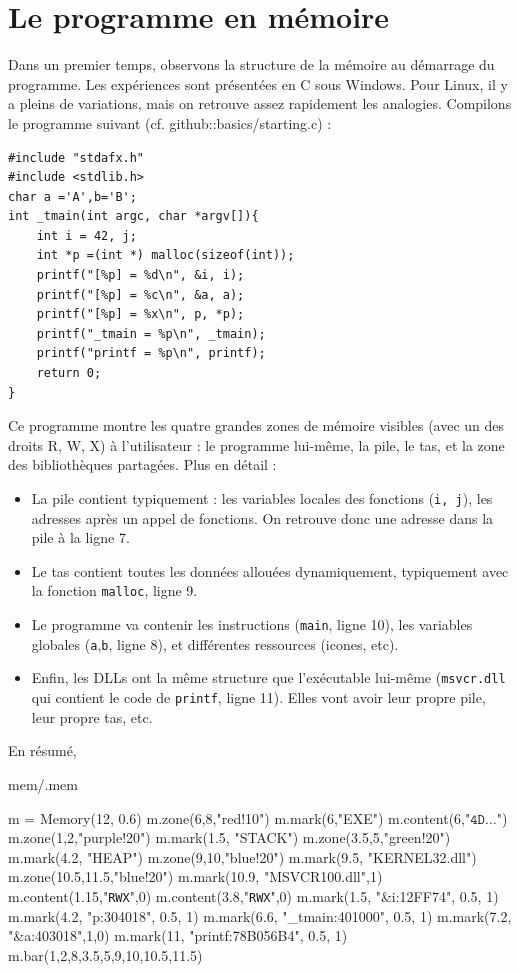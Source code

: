 \documentclass{book}
\newcounter{Qcours}
\newenvironment{memory}{%
	\noindent
	\VerbatimEnvironment\stepcounter{Qcours}%
	\begin{VerbatimOut}{mem/\theQcours.mem}%
	}{\end{VerbatimOut}%
}
\newcommand{\C}{\textsc{C}\xspace}
\newcommand{\code}[1]{\texttt{#1}}
\begin{document}
\section{Le programme en mémoire}

Dans un premier temps, observons la structure de la mémoire au démarrage du programme. Les expériences sont présentées en \C sous Windows. Pour Linux, il y a pleins de variations, mais on retrouve assez rapidement les analogies. Compilons le programme suivant (cf. github::basics/starting.c) : 

\begin{verbatim}
#include "stdafx.h"
#include <stdlib.h>
char a ='A',b='B';
int _tmain(int argc, char *argv[]){
	int i = 42, j;
	int *p =(int *) malloc(sizeof(int));
	printf("[%p] = %d\n", &i, i);
	printf("[%p] = %c\n", &a, a);
	printf("[%p] = %x\n", p, *p);
	printf("_tmain = %p\n", _tmain);
	printf("printf = %p\n", printf);
	return 0;
}
\end{verbatim}

Ce programme montre les quatre grandes zones de mémoire visibles (avec un des droits R, W, X) à l'utilisateur :  le programme lui-même, la pile, le tas, et la zone des bibliothèques partagées. Plus en détail : 
\begin{itemize}
	\item La pile contient typiquement : les variables locales des fonctions (\code{i, j}), les adresses après un appel de fonctions. On retrouve donc une adresse dans la pile à la ligne 7. 
	\item Le tas contient toutes les données allouées dynamiquement, typiquement avec la fonction \code{malloc}, ligne 9.  
	\item   Le programme va contenir les instructions (\code{main}, ligne 10), les variables globales (\code{a},\code{b}, ligne 8), et différentes ressources (icones, etc). 
	\item  Enfin, les DLLs ont la même structure que l'exécutable lui-même (\code{msvcr.dll} qui contient le code de \code{printf}, ligne 11). Elles vont avoir leur propre pile, leur propre tas, etc. 
\end{itemize}

En résumé, 

\medskip
\begin{memory}
m = Memory(12, 0.6)
m.zone(6,8,"red!10")
m.mark(6,"EXE")
m.content(6,"$\code{4D}\ldots$")
m.zone(1,2,"purple!20")
m.mark(1.5, "STACK")
m.zone(3.5,5,"green!20")
m.mark(4.2, "HEAP")
m.zone(9,10,"blue!20")
m.mark(9.5, "KERNEL32.dll")
m.zone(10.5,11.5,"blue!20")
m.mark(10.9, "MSVCR100.dll",1)
m.content(1.15,"\code{RWX}",0)
m.content(3.8,"\code{RWX}",0)
m.mark(1.5, "\&i:12FF74", 0.5, 1)
m.mark(4.2, "p:304018", 0.5, 1)
m.mark(6.6, "\_tmain:401000", 0.5, 1)
m.mark(7.2, "\&a:403018",1,0)
m.mark(11, "printf:78B056B4", 0.5, 1)
m.bar(1,2,8,3.5,5,9,10,10.5,11.5)
\end{memory}
\end{document}
